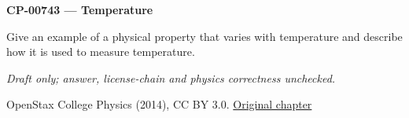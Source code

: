 \par\medskip
\noindent\textbf{CP-00743 — Temperature}
\par Give an example of a physical property that varies with temperature and describe how it is used to measure temperature.
\par\smallskip
\textit{Draft only; answer, license-chain and physics correctness unchecked.}
\par{\footnotesize OpenStax College Physics (2014), CC BY 3.0. \href{https://github.com/philschatz/physics-book/blob/a7efaa7e221fab1694022d8bb98b83a73ee31d3d/contents/m42214.md}{Original chapter}}\par\normalsize

